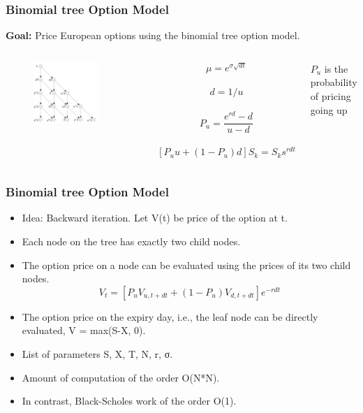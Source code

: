\documentclass[xcolor={x11names,svgnames,dvipsnames}]{beamer}
\begin{document}
\begin{frame}
\frametitle{Binomial tree Option Model}
\textbf{Goal:} Price European options using the binomial tree option model.
\begin{columns}
\column{2.4in}
 \begin{figure}
     \includegraphics[width=0.8\textwidth, height=0.6\textheight]{binary.png}
\end{figure}

\column{2.5in}

$$\mu = e^{\sigma \sqrt{dt}}$$\\
$$d = 1/u$$\\
$$P_u =\frac{e^{rd}-d}{u-d}$$\\
$$[P_uu+(1-P_u)d]S_k = S_k s^{rdt}$$

$P_u$ is the probability of pricing going up
\end{columns}

\end{frame}

\begin{frame}
\frametitle{Binomial tree Option Model}
\begin{itemize}
\item Idea: Backward iteration. Let V(t) be price of the option at t.
\item Each node on the tree has exactly two child nodes.
\item The option price on a node can be evaluated using the prices of
its two child nodes.\\
$$V_t = [P_u V_{u, t+dt}+ (1-P_u)V_{d,t+dt}]e^{-rdt}$$
\item The option price on the expiry day, i.e., the leaf node can be
directly evaluated, V = max(S-X, 0).
\item List of parameters {S, X, T, N, r, σ}.
\item Amount of computation of the order O(N*N).
\item In contrast, Black-Scholes work of the order O(1).
\end{itemize}
\end{frame}
\end{document}

